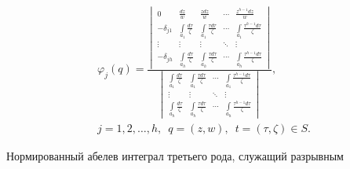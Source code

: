 \begin{gather*}


\varphi_j(q)=


\frac{


\begin{vmatrix}


0 & \frac{dz}w & \frac{zdz}w & \dotsb & \frac{z^{h-1}dz}w \\[2mm]


-\delta_{j1} & \int \limits_{a_1}\frac{d\tau}\zeta &


\int \limits_{a_1}\frac{\tau d\tau}\zeta & \dotsb &


\int \limits_{a_1}\frac{\tau^{h-1}d\tau}\zeta \\


\vdots & \vdots & \vdots & \ddots & \vdots \\


-\delta_{jh} & \int \limits_{a_h}\frac{d\tau}\zeta &


\int \limits_{a_h}\frac{\tau d\tau}\zeta & \dotsb &


\int \limits_{a_h}\frac{\tau^{h-1}d\tau}\zeta


\end{vmatrix}


}


{\begin{vmatrix}


\int \limits_{a_1}\frac{d\tau}\zeta &


\int \limits_{a_1}\frac{\tau d\tau}\zeta & \dotsb &


\int \limits_{a_1}\frac{\tau^{h-1}d\tau}\zeta \\


\vdots & \vdots & \ddots & \vdots \\


\int \limits_{a_h}\frac{d\tau}\zeta &


\int \limits_{a_h}\frac{\tau d\tau}\zeta & \dotsb &


\int \limits_{a_h}\frac{\tau^{h-1}d\tau}\zeta


\end{vmatrix}


}, \\


%


j=1, 2,\dotsc,h,\ \; q=(z, w),\ \; t=(\tau, \zeta)\in S.


\end{gather*}


Нормированный абелев интеграл третьего рода, служащий разрывным


